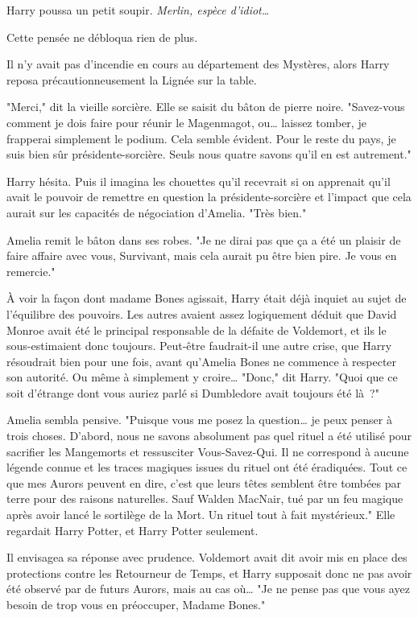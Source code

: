 Harry poussa un petit soupir. \emph{Merlin, espèce d'idiot…}

Cette pensée ne débloqua rien de plus.

Il n'y avait pas d'incendie en cours au département des Mystères, alors Harry reposa précautionneusement la Lignée sur la table.

"Merci," dit la vieille sorcière. Elle se saisit du bâton de pierre noire. "Savez-vous comment je dois faire pour réunir le Magenmagot, ou… laissez tomber, je frapperai simplement le podium. Cela semble évident. Pour le reste du pays, je suis bien sûr présidente-sorcière. Seuls nous quatre savons qu'il en est autrement."

Harry hésita. Puis il imagina les chouettes qu'il recevrait si on apprenait qu'il avait le pouvoir de remettre en question la présidente-sorcière et l'impact que cela aurait sur les capacités de négociation d'Amelia. "Très bien."

Amelia remit le bâton dans ses robes. "Je ne dirai pas que ça a été un plaisir de faire affaire avec vous, Survivant, mais cela aurait pu être bien pire. Je vous en remercie."

À voir la façon dont madame Bones agissait, Harry était déjà inquiet au sujet de l'équilibre des pouvoirs. Les autres avaient assez logiquement déduit que David Monroe avait été le principal responsable de la défaite de Voldemort, et ils le sous-estimaient donc toujours. Peut-être faudrait-il une autre crise, que Harry résoudrait bien pour une fois, avant qu'Amelia Bones ne commence à respecter son autorité. Ou même à simplement y croire… "Donc," dit Harry. "Quoi que ce soit d'étrange dont vous auriez parlé si Dumbledore avait toujours été là~?"

Amelia sembla pensive. "Puisque vous me posez la question… je peux penser à trois choses. D'abord, nous ne savons absolument pas quel rituel a été utilisé pour sacrifier les Mangemorts et ressusciter Vous-Savez-Qui. Il ne correspond à aucune légende connue et les traces magiques issues du rituel ont été éradiquées. Tout ce que mes Aurors peuvent en dire, c'est que leurs têtes semblent être tombées par terre pour des raisons naturelles. Sauf Walden MacNair, tué par un feu magique après avoir lancé le sortilège de la Mort. Un rituel tout à fait mystérieux." Elle regardait Harry Potter, et Harry Potter seulement.

Il envisagea sa réponse avec prudence. Voldemort avait dit avoir mis en place des protections contre les Retourneur de Temps, et Harry supposait donc ne pas avoir été observé par de futurs Aurors, mais au cas où… "Je ne pense pas que vous ayez besoin de trop vous en préoccuper, Madame Bones."

